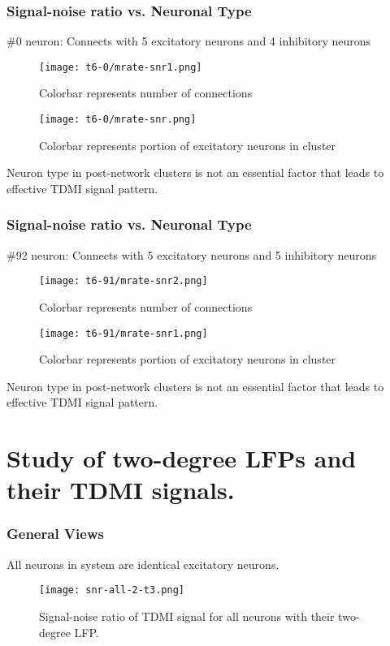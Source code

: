 \documentclass{beamer}
\begin{document}
	\begin{frame}
	\frametitle{Signal-noise ratio vs. Neuronal Type}
	\small{\#0 neuron: Connects with 5 excitatory neurons and 4 inhibitory neurons}
		\begin{figure}[h]
			\centering
			\begin{minipage}[ht]{0.49\linewidth}
				\centering
				\texttt{[image: t6-0/mrate-snr1.png]}
				\caption{Colorbar represents number of connections}
			\end{minipage}
			\begin{minipage}[ht]{0.49\linewidth}
				\centering
				\texttt{[image: t6-0/mrate-snr.png]}
				\caption{Colorbar represents portion of excitatory neurons in cluster}
			\end{minipage}
			\label{fig:mrate_snr_t6-0}
		\end{figure}
		\footnotesize{Neuron type in post-network clusters is not an essential factor that leads to effective TDMI signal pattern.}
	\end{frame}

	\begin{frame}
	\frametitle{Signal-noise ratio vs. Neuronal Type}
	\small{\#92 neuron: Connects with 5 excitatory neurons and 5 inhibitory neurons}
		\begin{figure}[h]
			\centering
			\begin{minipage}[ht]{0.49\linewidth}
				\centering
				\texttt{[image: t6-91/mrate-snr2.png]}
				\caption{Colorbar represents number of connections}
			\end{minipage}
			\begin{minipage}[ht]{0.49\linewidth}
				\centering
				\texttt{[image: t6-91/mrate-snr1.png]}
				\caption{Colorbar represents portion of excitatory neurons in cluster}
			\end{minipage}
			\label{fig:mrate_snr_t6-0}
		\end{figure}
		\footnotesize{Neuron type in post-network clusters is not an essential factor that leads to effective TDMI signal pattern.}
	\end{frame}

	\section{Study of two-degree LFPs and their TDMI signals.}
	\begin{frame}
		\frametitle{General Views}
		\footnotesize{All neurons in system are identical excitatory neurons.} 
		\begin{figure}
			\centering
			\texttt{[image: snr-all-2-t3.png]}
			\caption{\footnotesize{Signal-noise ratio of TDMI signal for all neurons with their two-degree LFP.}}
			\label{fig:snr_all_2}
		\end{figure}
	\end{frame}
\end{document}
